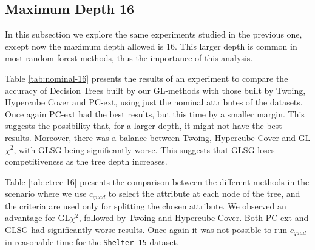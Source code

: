 \subsection{Maximum Depth 16}


In this subsection we explore the same experiments studied in the previous one, except now the maximum depth allowed is 16. This larger depth is common in most random forest methods, thus the importance of this analysis.

Table \ref{tab:nominal-16} presents the results of an experiment to
compare the accuracy of  Decision Trees built by our GL-methods with those built by Twoing, Hypercube Cover and PC-ext, using just the nominal attributes of the datasets. Once again PC-ext had the best results, but this time by a smaller margin. This suggests the possibility that, for a larger depth, it might not have the best results. Moreover, there was a balance between Twoing, Hypercube Cover and GL$\chi^2$, with GLSG being significantly worse. This suggests that GLSG loses competitiveness as the tree depth increases.

Table \ref{tab:ctree-16} presents the 
comparison between the different methods in the scenario where we use $c_{quad}$ to select the attribute at each node of the tree, and the criteria are used only for splitting the chosen attribute. We observed an advantage for GL$\chi^2$, followed by Twoing and Hypercube Cover. Both PC-ext and GLSG had significantly worse results. Once again it was not possible to run $c_{quad}$ in reasonable time for the {\tt Shelter-15} dataset.

